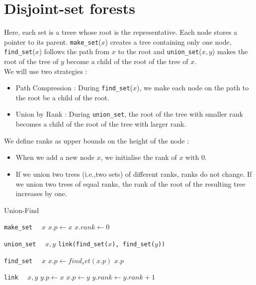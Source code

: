\documentclass{cours}
\begin{document}
\section{Disjoint-set forests}
Here, each set is a treee whose root is the representative. Each node stores a pointer to its parent. \texttt{make_set}($x$) creates a tree containing only one node, \texttt{find_set}($x$) follows the path from $x$ to the root and \texttt{union_set}($x, y$) makes the root of the tree of $y$ become a child of the root of the tree of $x$.\\
We will use two strategies : 
\begin{itemize}
    \item Path Compression : During \texttt{find_set}($x$), we make each node on the path to the root be a child of the root.
    \item Union by Rank : During \texttt{union_set}, the root of the tree with smaller rank becomes a child of the root of the tree with larger rank.
\end{itemize}

\begin{definition}
    We define ranks as upper bounds on the height of the node :
    \begin{itemize}
        \item When we add a new node $x$, we initialise the rank of $x$ with $0$.
        \item If we union two trees (i.e.,two sets) of different ranks, ranks do not change. If we union two trees of equal ranks, the rank of the root of the resulting tree increases by one.
    \end{itemize}
\end{definition}

\begin{algorithm}
    \caption{Union-Find}
    \begin{algorithmic}
        \Function \texttt{make_set}
        \Input \ \ $x$
        \EndInput
        \State $x.p \gets x$
        \State $x.rank \gets 0$
        \EndFunction

        \Function \texttt{union_set}
        \Input \ \ $x, y$
        \EndInput
        \State \texttt{link(find_set($x$), find_set($y$))}
        \EndFunction

        \Function \texttt{find_set}
        \Input \ \ $x$
        \EndInput
            \State $x.p \gets find_set(x.p)$
        \EndIf
        \Return $x.p$
        \EndFunction

        \Function \texttt{link}
        \Input \ \ $x, y$
                \State $y.p \gets x$
            \Else 
                \State $x.p \gets y$
                    \State $y.rank \gets y.rank + 1$
                \EndIf
            \EndIf
        \EndIf
        \EndFunction
    \end{algorithmic}
\end{algorithm}
\end{document}
